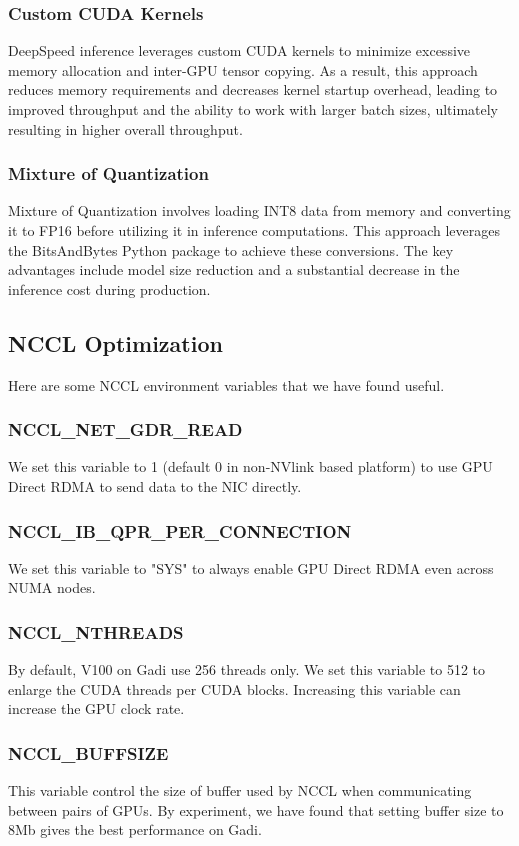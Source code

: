 \subsubsection{Custom CUDA Kernels}
DeepSpeed inference leverages custom CUDA kernels to minimize excessive memory allocation and inter-GPU tensor copying. As a result, this approach reduces memory requirements and decreases kernel startup overhead, leading to improved throughput and the ability to work with larger batch sizes, ultimately resulting in higher overall throughput.

\subsubsection{Mixture of Quantization}
Mixture of Quantization involves loading INT8 data from memory and converting it to FP16 before utilizing it in inference computations. This approach leverages the BitsAndBytes Python package to achieve these conversions. The key advantages include model size reduction and a substantial decrease in the inference cost during production.

\subsection{NCCL Optimization}
Here are some NCCL environment variables that we have found useful.
\subsubsection{NCCL\_NET\_GDR\_READ}
We set this variable to 1 (default 0 in non-NVlink based platform) to use GPU Direct RDMA to send data to the NIC directly.
\subsubsection{NCCL\_IB\_QPR\_PER\_CONNECTION}
We set this variable to "SYS" to always enable GPU Direct RDMA even across NUMA nodes.
\subsubsection{NCCL\_NTHREADS}
By default, V100 on Gadi use 256 threads only. We set this variable to 512 to enlarge the CUDA threads per CUDA blocks. Increasing this variable can increase the GPU clock rate.
\subsubsection{NCCL\_BUFFSIZE}
This variable control the size of buffer used by NCCL when communicating between pairs of GPUs. By experiment, we have found that setting buffer size to 8Mb gives the best performance on Gadi.



